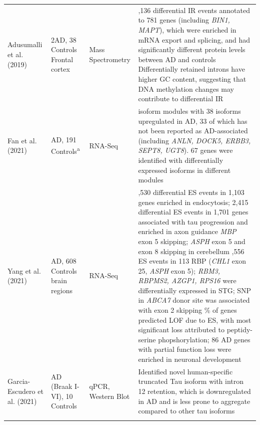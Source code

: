 \begin{landscape}
\begin{longtable}[c]{p{3cm}p{4cm}p{3cm}p{16cm}}
		\centering Adusumalli et al. (2019) \cite{Adusumalli2019} &
		\centering 4 2AD, 38 Controls\cite{Bai2013} \newline Frontal cortex &
		\centering Mass Spectrometry &
		\tabitem 1,136 differential IR events annotated to 781 genes (including \textit{BIN1, MAPT}), which were enriched in mRNA export and splicing, and had significantly different protein levels between AD and controls \newline
		\tabitem Differentially retained introns have higher GC content, suggesting that DNA methylation changes may contribute to differential IR \\
		\hdashline[0.5pt/5pt]
		
		\centering Fan et al. (2021) \cite{Fan2021} &
		\centering 210 AD, 191 Controls\textsuperscript{a} &
		\centering RNA-Seq &
		\tabitem 2 isoform modules with 38 isoforms upregulated in AD, 33 of which has not been reported as AD-associated (including \textit{ANLN, DOCK5, ERBB3, SEPT8, UGT8}). 67 genes were identified with differentially expressed isoforms in different modules  \\
		
		\centering Yang et al. (2021) \cite{Yang2021} &
		\centering 1074 AD, 608 Controls \newline 9 brain regions&
		\centering RNA-Seq & 
		\tabitem 1,530 differential ES events in 1,103 genes enriched in endocytosis; 2,415 differential ES events in 1,701 genes associated with tau progression and enriched in axon guidance \newline 
		\tabitem \textit{MBP} exon 5 skipping; \textit{ASPH} exon 5 and exon 8 skipping in cerebellum \newline  
		\tabitem 15,556 ES events in 113 RBP (\textit{CHL1} exon 25, \textit{ASPH} exon 5); \textit{RBM3, RBPMS2, AZGP1, RPS16} were differentially expressed in STG; SNP in \textit{ABCA7} donor site was associated with exon 2 skipping \newline 
		\tabitem 70\% of genes predicted LOF due to ES, with most significant loss attributed to peptidy-serine phopshorylation; 86 AD genes with partial function loss were enriched in neuronal development	\\
		\hdashline[0.5pt/5pt]		
		
		\centering Garcia-Escudero et al. (2021) \cite{Garcia-Escudero2021} &
		\centering 32 AD (Braak I-VI), 10 Controls &
		\centering qPCR, Western Blot &
		\tabitem Identified novel human-specific truncated Tau isoform with intron 12 retention, which is downregulated in AD and is less prone to aggregate compared to other tau isoforms \\
		\hdashline[0.5pt/5pt]
		

\end{longtable}
\end{landscape}
